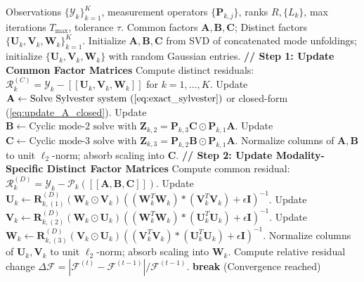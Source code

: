 \documentclass[11pt,a4paper]{article}
\begin{document}
\begin{algorithm}[htbp]
\caption{Personalized Coupled Tensor Decomposition via Alternating Least Squares (PCTD-ALS)}
\label{alg:pctd}
\begin{algorithmic}[1]
\REQUIRE Observations $\{\bm{\mathcal{Y}}_k\}_{k=1}^K$, measurement operators $\{\mathbf{P}_{k,j}\}$, ranks $R, \{L_k\}$, max iterations $T_{\max}$, tolerance $\tau$.
\ENSURE Common factors $\mathbf{A}, \mathbf{B}, \mathbf{C}$; Distinct factors $\{\mathbf{U}_k, \mathbf{V}_k, \mathbf{W}_k\}_{k=1}^K$.
\STATE Initialize $\mathbf{A}, \mathbf{B}, \mathbf{C}$ from SVD of concatenated mode unfoldings; initialize $\{\mathbf{U}_k, \mathbf{V}_k, \mathbf{W}_k\}$ with random Gaussian entries.
    \STATE \textbf{// Step 1: Update Common Factor Matrices}
    \STATE Compute distinct residuals: $\bm{\mathcal{R}}_k^{(C)} = \bm{\mathcal{Y}}_k - [\![\mathbf{U}_k, \mathbf{V}_k, \mathbf{W}_k]\!]$ for $k=1, \dots, K$.
    \STATE Update $\mathbf{A} \leftarrow \text{Solve Sylvester system (\ref{eq:exact_sylvester})}$ or closed-form (\ref{eq:update_A_closed}).
    \STATE Update $\mathbf{B} \leftarrow \text{Cyclic mode-2 solve with } \mathbf{Z}_{k,2} = \mathbf{P}_{k,3}\mathbf{C} \odot \mathbf{P}_{k,1}\mathbf{A}$.
    \STATE Update $\mathbf{C} \leftarrow \text{Cyclic mode-3 solve with } \mathbf{Z}_{k,3} = \mathbf{P}_{k,2}\mathbf{B} \odot \mathbf{P}_{k,1}\mathbf{A}$.
    \STATE Normalize columns of $\mathbf{A}, \mathbf{B}$ to unit $\ell_2$-norm; absorb scaling into $\mathbf{C}$.
    \STATE \textbf{// Step 2: Update Modality-Specific Distinct Factor Matrices}
        \STATE Compute common residual: $\bm{\mathcal{R}}_k^{(D)} = \bm{\mathcal{Y}}_k - \bm{\mathcal{P}}_k([\![\mathbf{A}, \mathbf{B}, \mathbf{C}]\!])$.
        \STATE Update $\mathbf{U}_k \leftarrow \mathbf{R}_{k,(1)}^{(D)} (\mathbf{W}_k \odot \mathbf{V}_k) \left( (\mathbf{W}_k^T\mathbf{W}_k) * (\mathbf{V}_k^T\mathbf{V}_k) + \epsilon \mathbf{I} \right)^{-1}$.
        \STATE Update $\mathbf{V}_k \leftarrow \mathbf{R}_{k,(2)}^{(D)} (\mathbf{W}_k \odot \mathbf{U}_k) \left( (\mathbf{W}_k^T\mathbf{W}_k) * (\mathbf{U}_k^T\mathbf{U}_k) + \epsilon \mathbf{I} \right)^{-1}$.
        \STATE Update $\mathbf{W}_k \leftarrow \mathbf{R}_{k,(3)}^{(D)} (\mathbf{V}_k \odot \mathbf{U}_k) \left( (\mathbf{V}_k^T\mathbf{V}_k) * (\mathbf{U}_k^T\mathbf{U}_k) + \epsilon \mathbf{I} \right)^{-1}$.
        \STATE Normalize columns of $\mathbf{U}_k, \mathbf{V}_k$ to unit $\ell_2$-norm; absorb scaling into $\mathbf{W}_k$.
    \ENDFOR
    \STATE Compute relative residual change $\Delta \mathcal{F} = |\mathcal{F}^{(t)} - \mathcal{F}^{(t-1)}| / \mathcal{F}^{(t-1)}$.
        \STATE \textbf{break} (Convergence reached)
    \ENDIF
\ENDFOR
\end{algorithmic}
\end{algorithm}
\end{document}
